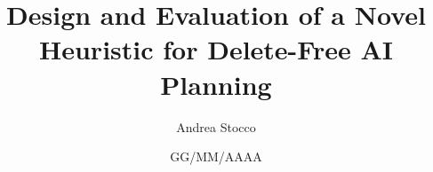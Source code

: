 \documentclass[12pt,a4paper,twoside,openright]{extreport}
\title{Design and Evaluation of a Novel Heuristic for Delete-Free AI Planning}
\author{Andrea Stocco}
\date{GG/MM/AAAA}
\theoremstyle{definition}
\begin{document}
\pagestyle{empty} %


\cleardoublepage


\cleardoublepage

\begin{abstract}
	
\end{abstract}
\cleardoublepage

\pagestyle{plain} %

\tableofcontents
\cleardoublepage

\listoffigures
\cleardoublepage %

\listoftables
\cleardoublepage

\listofalgorithms
\cleardoublepage



\cleardoublepage


\cleardoublepage


\cleardoublepage


\cleardoublepage

\nocite{planning-tutorial}
\printbibliography[heading=bibintoc]
\end{document}
